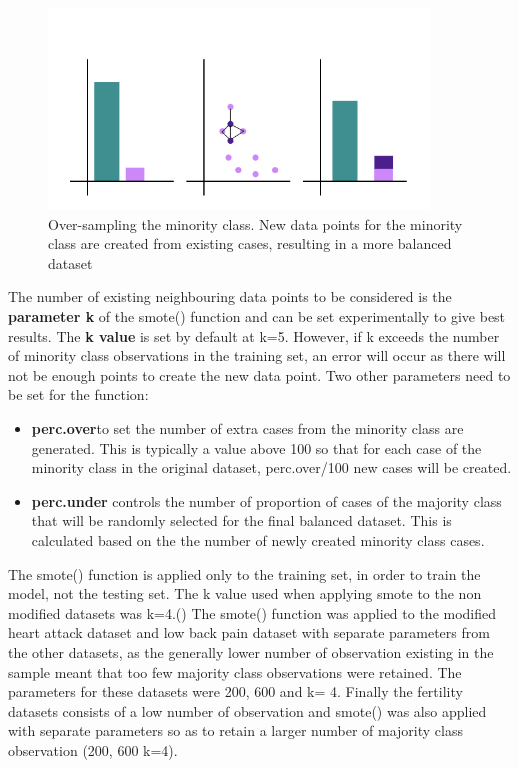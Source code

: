 \begin{figure}[!htbp]
    \centering
    \includegraphics[width=0.9\textwidth]{ThesisTemplate/usingLatex/chapter4Images/Figure2002.png}
    \caption{Over-sampling the minority class. New data points for the minority class are created from existing cases, resulting in a more balanced dataset}
    \label{fig:my_label}
\end{figure}


The number of existing neighbouring data points to be considered is the \textbf{parameter k} of the smote() function and can be set experimentally to give best results.\newline
The \textbf{k value} is set by default at k=5. However, if k exceeds the number of minority class observations in the training set, an error will occur as there will not be enough points to create the new data point.\newline
Two other parameters need to be set for the function: 
\begin{itemize}
    \item \textbf{perc.over}to set the number of extra cases from the minority class are generated. This is typically a value above 100 so that for each case of the minority class in the original dataset, perc.over/100 new cases will be created.
    \item \textbf{perc.under} controls the number of proportion of cases of the majority class that will be randomly selected for the final balanced dataset. This is calculated based on the the number of newly created minority class cases. 
\end{itemize}

The smote() function is applied only to the training set, in order to train the model,  not the testing set.\newline
The k value used when applying smote to the non modified datasets was k=4.\newline()
The smote() function was applied to the modified heart attack dataset and low back pain dataset with separate parameters from the other datasets, as the generally lower number of observation existing in the sample meant that too few majority class observations were retained. The parameters for these datasets were 200, 600 and k= 4.
Finally the fertility datasets consists of a low number of observation and smote() was also applied with separate parameters so as to retain a larger number of majority class observation (200, 600 k=4).



